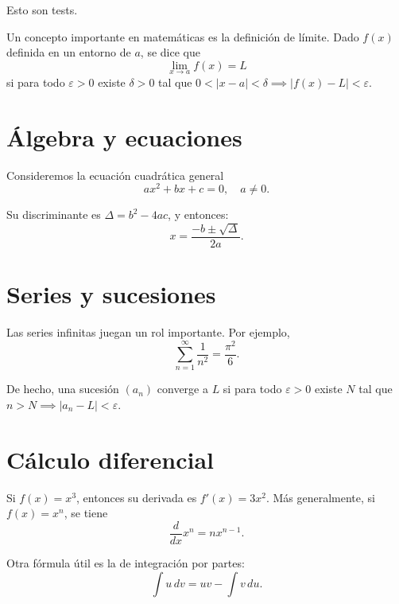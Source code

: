 \documentclass[a5paper,DIV=12,11pt]{scrbook}
\begin{document}
    Esto son tests. \newpage

    \lipsum[1-2]

    Un concepto importante en matemáticas es la definición de límite.  
    Dado $f(x)$ definida en un entorno de $a$, se dice que
    \[
    \lim_{x \to a} f(x) = L
    \]
    si para todo $\varepsilon > 0$ existe $\delta > 0$ tal que 
    $0 < |x-a| < \delta \implies |f(x)-L| < \varepsilon$.

    \lipsum[3]

    \section{Álgebra y ecuaciones}
    Consideremos la ecuación cuadrática general
    \begin{equation}
    ax^2 + bx + c = 0, \quad a \neq 0.
    \end{equation}

    Su discriminante es $\Delta = b^2 - 4ac$, y entonces:
    \[
    x = \frac{-b \pm \sqrt{\Delta}}{2a}.
    \]

    \lipsum[4-5]

    \section{Series y sucesiones}
    Las series infinitas juegan un rol importante. Por ejemplo,
    \begin{equation}
    \sum_{n=1}^\infty \frac{1}{n^2} = \frac{\pi^2}{6}.
    \end{equation}

    De hecho, una sucesión $(a_n)$ converge a $L$ si para todo $\varepsilon>0$ existe $N$ tal que $n>N \implies |a_n - L| < \varepsilon$.

    \lipsum[6-7]

    \section{Cálculo diferencial}
    Si $f(x)=x^3$, entonces su derivada es $f'(x)=3x^2$.
    Más generalmente, si $f(x)=x^n$, se tiene
    \begin{equation}
    \frac{d}{dx} x^n = n x^{n-1}.
    \end{equation}

    \lipsum[8]

    Otra fórmula útil es la de integración por partes:
    \[
    \int u \, dv = uv - \int v \, du.
    \]

    \lipsum[9-10]
\end{document}
